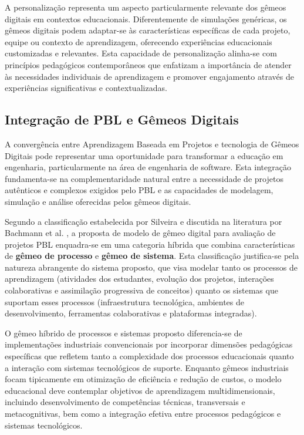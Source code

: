 \documentclass[12pt, a4paper, oneside, brazilian]{abntex2}
\begin{document}
A personalização representa um aspecto particularmente relevante dos gêmeos digitais em contextos educacionais. Diferentemente de simulações genéricas, os gêmeos digitais podem adaptar-se às características específicas de cada projeto, equipe ou contexto de aprendizagem, oferecendo experiências educacionais customizadas e relevantes. Esta capacidade de personalização alinha-se com princípios pedagógicos contemporâneos que enfatizam a importância de atender às necessidades individuais de aprendizagem e promover engajamento através de experiências significativas e contextualizadas.

\subsection{Integração de PBL e Gêmeos Digitais}

A convergência entre Aprendizagem Baseada em Projetos e tecnologia de Gêmeos Digitais pode representar uma oportunidade para transformar a educação em engenharia, particularmente na área de engenharia de software. Esta integração fundamenta-se na complementaridade natural entre a necessidade de projetos autênticos e complexos exigidos pelo PBL e as capacidades de modelagem, simulação e análise oferecidas pelos gêmeos digitais.

Segundo a classificação estabelecida por Silveira \cite{silveira2024panorama} e discutida na literatura por Bachmann et al. \cite{bachmann2023}, a proposta de modelo de gêmeo digital para avaliação de projetos PBL enquadra-se em uma categoria híbrida que combina características de \textbf{gêmeo de processo} e \textbf{gêmeo de sistema}. Esta classificação justifica-se pela natureza abrangente do sistema proposto, que visa modelar tanto os processos de aprendizagem (atividades dos estudantes, evolução dos projetos, interações colaborativas e assimilação progressiva de conceitos) quanto os sistemas que suportam esses processos (infraestrutura tecnológica, ambientes de desenvolvimento, ferramentas colaborativas e plataformas integradas).

O gêmeo híbrido de processos e sistemas proposto diferencia-se de implementações industriais convencionais por incorporar dimensões pedagógicas específicas que refletem tanto a complexidade dos processos educacionais quanto a interação com sistemas tecnológicos de suporte. Enquanto gêmeos industriais focam tipicamente em otimização de eficiência e redução de custos, o modelo educacional deve contemplar objetivos de aprendizagem multidimensionais, incluindo desenvolvimento de competências técnicas, transversais e metacognitivas, bem como a integração efetiva entre processos pedagógicos e sistemas tecnológicos.
\end{document}
